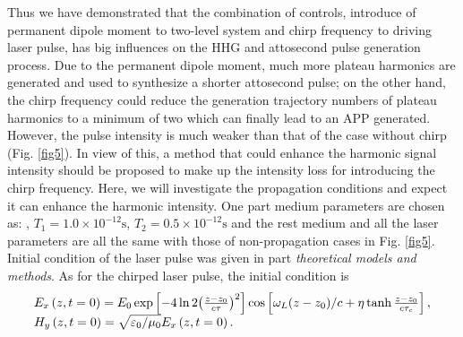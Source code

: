 \documentclass[10pt,letterpaper]{article}
\begin{document}
Thus we have demonstrated that the combination of controls, introduce of permanent dipole moment to two-level system and chirp frequency to driving laser pulse, has big influences on the HHG and attosecond pulse generation process. Due to the permanent dipole moment, much more plateau harmonics are generated and used to synthesize a shorter attosecond pulse; on the other hand, the chirp frequency could reduce the generation trajectory numbers of plateau harmonics to a minimum of two which can finally lead to an APP generated. However, the pulse intensity is much weaker than that of the case without chirp (Fig. \ref{fig5}). In view of this, a method that could enhance the harmonic signal intensity should be proposed to make up the intensity loss for introducing the chirp frequency. Here, we will investigate the propagation conditions and expect it can enhance the harmonic intensity. One part medium parameters are chosen as: , $ T_{1}=1.0\times10^{-12} \textrm{s} $, $ T_{2}=0.5\times10^{-12} \textrm{s} $ \cite{Kalosha-Two-Level-PRL-1999} and the rest medium and all the laser parameters are all the same with those of non-propagation cases in Fig. \ref{fig5}. Initial condition of the laser pulse was given in part \emph{theoretical models and methods}. As for the chirped laser pulse, the initial condition is
\begin{equation}
\begin{array}{l}
{E_x}\left( {z,t = 0} \right) = {E_0}\exp \left[ { - 4\ln 2{{\left( {\frac{{z - {z_0}}}{{c\tau }}} \right)}^2}} \right]\cos \left[ {{\omega _L}{{\left( {z - {z_0}} \right)} \mathord{\left/
			{\vphantom {{\left( {z - {z_0}} \right)} c}} \right.
			\kern-\nulldelimiterspace} c} + \eta \tanh \frac{{z - {z_0}}}{{c{\tau _c}}}} \right],\\
{H_y}\left( {z,t = 0} \right) = \sqrt {{{{\varepsilon _0}} \mathord{\left/
			{\vphantom {{{\varepsilon _0}} {{\mu _0}}}} \right.
			\kern-\nulldelimiterspace} {{\mu _0}}}} {E_x}\left( {z,t = 0} \right).
\end{array}
\label{eq20}
\end{equation}
\end{document}
